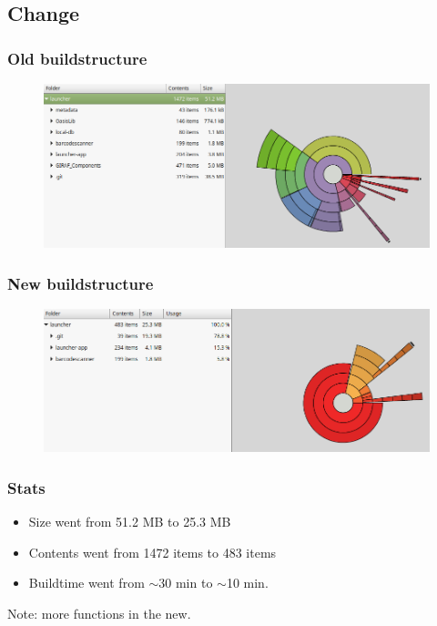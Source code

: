 \subsection{Change}
\begin{frame}
	\frametitle{Old buildstructure}
	\begin{figure}[H]
			\centering
			\includegraphics[width= 0.8 \textwidth]{pictures/StatsOld.png}
	\end{figure}
\end{frame}
\begin{frame}
	\frametitle{New buildstructure}
	\begin{figure}[H]
				\centering
				\includegraphics[width= 0.8 \textwidth]{pictures/StatsNew.png}
	\end{figure}
\end{frame}
\begin{frame}
	\frametitle{Stats}
	\begin{itemize}
		\item Size went from 51.2 MB  to 25.3 MB 
		\item Contents went from 1472 items to 	483	items
		\item Buildtime went from $\sim$30 min to $\sim$10 min.
	\end{itemize}
	Note: more functions in the new.
\end{frame}


